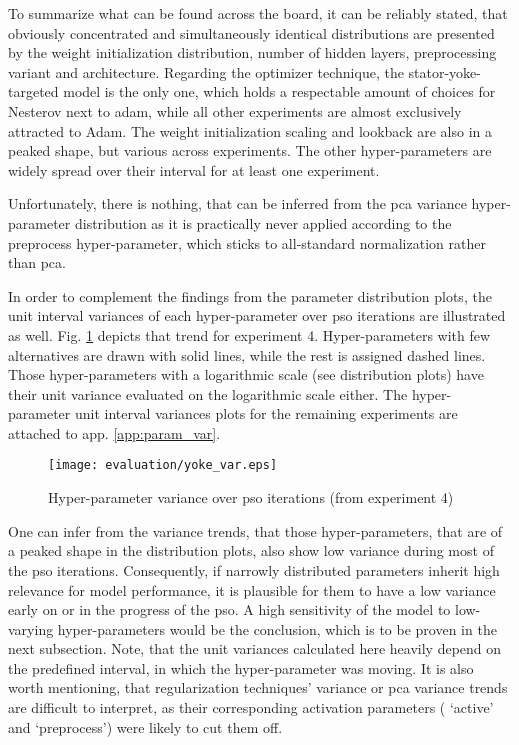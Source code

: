 To summarize what can be found across the board, it can be reliably stated, that obviously concentrated and simultaneously identical distributions are presented by the weight initialization distribution, number of hidden layers, preprocessing variant and architecture.
Regarding the optimizer technique, the stator-yoke-targeted model is the only one, which holds a respectable amount of choices for Nesterov next to \gls{adam}, while all other experiments are almost exclusively attracted to Adam. 
The weight initialization scaling and lookback are also in a peaked shape, but various across experiments.
The other hyper-parameters are widely spread over their interval for at least one experiment.

Unfortunately, there is nothing, that can be inferred from the \gls{pca} variance hyper-parameter distribution as it is practically never applied according to the preprocess hyper-parameter, which sticks to all-standard normalization rather than \gls{pca}.

In order to complement the findings from the parameter distribution plots, the unit interval variances of each hyper-parameter over \gls{pso} iterations are illustrated as well.
Fig. \ref{fig:param_var} depicts that trend for experiment 4.
Hyper-parameters with few alternatives are drawn with solid lines, while the rest is assigned dashed lines.
Those hyper-parameters with a logarithmic scale (see distribution plots) have their unit variance evaluated on the logarithmic scale either.
The hyper-parameter unit interval variances plots for the remaining experiments are attached to app. \ref{app:param_var}.

\begin{figure}[!tbh]
	\centering
	\texttt{[image: evaluation/yoke\_var.eps]}
	\caption{Hyper-parameter variance over \gls{pso} iterations (from experiment 4)}
	\label{fig:param_var}
\end{figure}

One can infer from the variance trends, that those hyper-parameters, that are of a peaked shape in the distribution plots, also show low variance during most of the \gls{pso} iterations.
Consequently, if narrowly distributed parameters inherit high relevance for model performance, it is plausible for them to have a low variance early on or in the progress of the \gls{pso}.
A high sensitivity of the model to low-varying hyper-parameters would be the conclusion, which is to be proven in the next subsection.
Note, that the unit variances calculated here heavily depend on the predefined interval, in which the hyper-parameter was moving.
It is also worth mentioning, that regularization techniques' variance or \gls{pca} variance trends are difficult to interpret, as their corresponding activation parameters ( `active' and `preprocess') were likely to cut them off.

